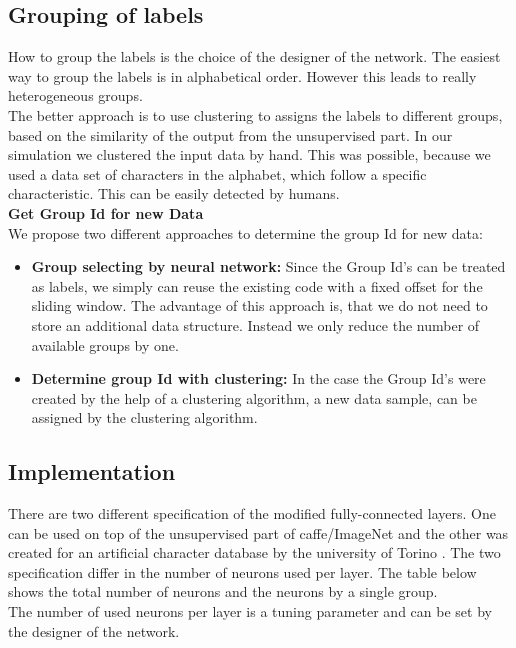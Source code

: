 \subsection{Grouping of labels}
How to group the labels is the choice of the designer of the network. The easiest way to group the labels is in alphabetical order. However this leads  to really heterogeneous groups. \\
The better approach is to use clustering to assigns the labels to different groups, based on the similarity of the output from the unsupervised part. 
In our simulation we clustered the input data by hand. This was possible, because we used a data set of characters in the alphabet, which follow a specific characteristic. This can be easily detected by humans. \\
\textbf{Get Group Id for new Data} \\
We propose two different approaches to determine the group Id for new data:
\begin{itemize}\itemsep0.5pt
    \item \textbf{Group selecting by neural network:} Since the Group Id's  can be treated as labels, we simply can reuse the existing code with a fixed offset for the sliding window. The advantage of this approach is, that we do not need to store an additional data structure. Instead we only reduce the number of available groups by one. 
     \item \textbf{Determine group Id with clustering:} In the case the Group Id's were created by the help of a clustering algorithm, a new data sample, can be assigned by the clustering algorithm. 
\end{itemize}
 


\subsection{Implementation}

There are two different specification of the modified fully-connected layers. One can be used on top of the unsupervised part of caffe/ImageNet and the other was created for an artificial character database by the university of Torino \cite{dset-sup}. 
The two specification differ in the number of neurons used per layer. The table below  shows the total number of neurons and the neurons by a single group.\\
The number of used neurons per layer is a tuning parameter and can be set by the designer of the network. 

